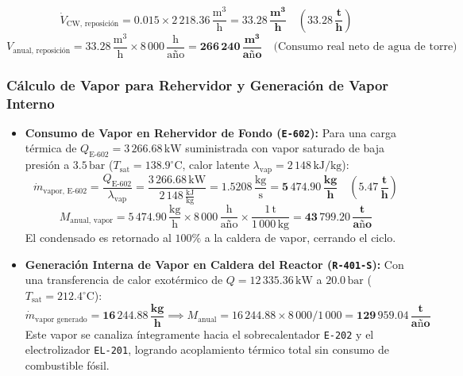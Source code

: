 \documentclass[10pt,letterpaper]{article}
\begin{document}
\begin{itemize}
    \begin{equation}
    \dot{V}_{\text{CW, reposición}} = 0.015 \times 2\,218.36\,\frac{\text{m}^3}{\text{h}} = \mathbf{33.28\,\frac{\text{m}^3}{\text{h}}} \quad \left(\mathbf{33.28\,\frac{\text{t}}{\text{h}}}\right)
    \end{equation}
    \begin{equation}
    V_{\text{anual, reposición}} = 33.28\,\frac{\text{m}^3}{\text{h}} \times 8\,000\,\frac{\text{h}}{\text{año}} = \mathbf{266\,240\,\frac{\text{m}^3}{\text{año}}} \quad \text{(Consumo real neto de agua de torre)}
    \end{equation}
\end{itemize}

\subsubsection{Cálculo de Vapor para Rehervidor y Generación de Vapor Interno}
\begin{itemize}
    \item \textbf{Consumo de Vapor en Rehervidor de Fondo (\texttt{E-602}):}
    Para una carga térmica de $Q_{\text{E-602}} = 3\,266.68\,\text{kW}$ suministrada con vapor saturado de baja presión a $3.5\,\text{bar}$ ($T_{\text{sat}} = 138.9^\circ\text{C}$, calor latente $\lambda_{\text{vap}} = 2\,148\,\text{kJ/kg}$):
    \begin{equation}
    \dot{m}_{\text{vapor, E-602}} = \frac{Q_{\text{E-602}}}{\lambda_{\text{vap}}} = \frac{3\,266.68\,\text{kW}}{2\,148\,\frac{\text{kJ}}{\text{kg}}} = 1.5208\,\frac{\text{kg}}{\text{s}} = \mathbf{5\,474.90\,\frac{\text{kg}}{\text{h}}} \quad \left(\mathbf{5.47\,\frac{\text{t}}{\text{h}}}\right)
    \end{equation}
    \begin{equation}
    M_{\text{anual, vapor}} = 5\,474.90\,\frac{\text{kg}}{\text{h}} \times 8\,000\,\frac{\text{h}}{\text{año}} \times \frac{1\,\text{t}}{1\,000\,\text{kg}} = \mathbf{43\,799.20\,\frac{\text{t}}{\text{año}}}
    \end{equation}
    El condensado es retornado al $100\%$ a la caldera de vapor, cerrando el ciclo.
    \item \textbf{Generación Interna de Vapor en Caldera del Reactor (\texttt{R-401-S}):}
    Con una transferencia de calor exotérmico de $Q = 12\,335.36\,\text{kW}$ a $20.0\,\text{bar}$ ($T_{\text{sat}} = 212.4^\circ\text{C}$):
    \begin{equation}
    \dot{m}_{\text{vapor generado}} = \mathbf{16\,244.88\,\frac{\text{kg}}{\text{h}}} \implies M_{\text{anual}} = 16\,244.88 \times 8\,000 / 1\,000 = \mathbf{129\,959.04\,\frac{\text{t}}{\text{año}}}
    \end{equation}
    Este vapor se canaliza íntegramente hacia el sobrecalentador \texttt{E-202} y el electrolizador \texttt{EL-201}, logrando acoplamiento térmico total sin consumo de combustible fósil.
\end{itemize}
\end{document}
